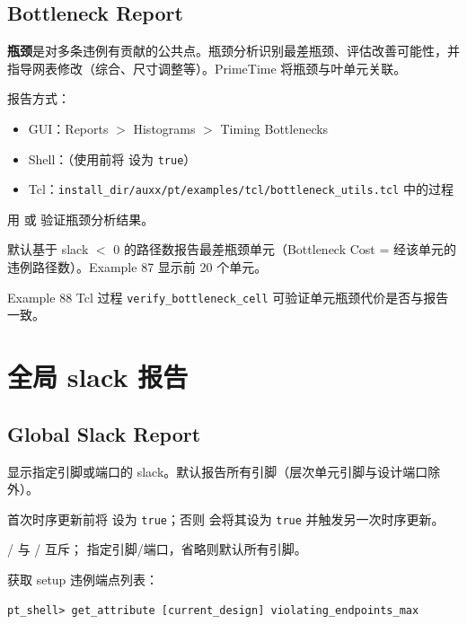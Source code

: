 \subsection*{Bottleneck Report}

\textbf{瓶颈}是对多条违例有贡献的公共点。瓶颈分析识别最差瓶颈、评估改善可能性，并指导网表修改（综合、尺寸调整等）。PrimeTime 将瓶颈与叶单元关联。

报告方式：
\begin{itemize}
  \item GUI：Reports $>$ Histograms $>$ Timing Bottlenecks
  \item Shell：（使用前将  设为 \texttt{true}）
  \item Tcl：\texttt{install\_dir/auxx/pt/examples/tcl/bottleneck\_utils.tcl} 中的过程
\end{itemize}

用  或  验证瓶颈分析结果。

 默认基于 slack $<$ 0 的路径数报告最差瓶颈单元（Bottleneck Cost = 经该单元的违例路径数）。Example 87 显示前 20 个单元。

Example 88 Tcl 过程 \texttt{verify\_bottleneck\_cell} 可验证单元瓶颈代价是否与报告一致。

\section{全局 slack 报告}
\subsection*{Global Slack Report}

 显示指定引脚或端口的 slack。默认报告所有引脚（层次单元引脚与设计端口除外）。

\begin{noteBox}
首次时序更新前将  设为 \texttt{true}；否则  会将其设为 \texttt{true} 并触发另一次时序更新。
\end{noteBox}

/ 与 / 互斥； 指定引脚/端口，省略则默认所有引脚。

获取 setup 违例端点列表：
\begin{lstlisting}
pt_shell> get_attribute [current_design] violating_endpoints_max
\end{lstlisting}


